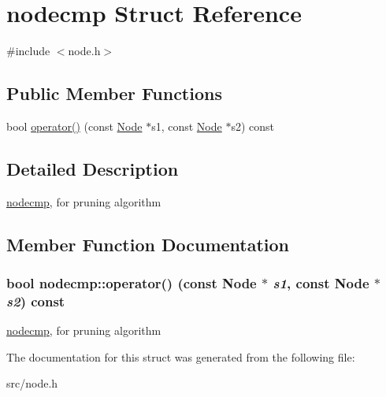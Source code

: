 \hypertarget{structnodecmp}{
\section{nodecmp Struct Reference}
\label{structnodecmp}
}


{\ttfamily \#include $<$node.h$>$}\subsection*{Public Member Functions}
\begin{DoxyCompactItemize}
\item 
bool \hyperlink{structnodecmp_a1125c1d530d06317a559aade3744bc78}{operator()} (const \hyperlink{classNode}{Node} $\ast$s1, const \hyperlink{classNode}{Node} $\ast$s2) const 
\end{DoxyCompactItemize}


\subsection{Detailed Description}
\hyperlink{structnodecmp}{nodecmp}, for pruning algorithm 

\subsection{Member Function Documentation}
\hypertarget{structnodecmp_a1125c1d530d06317a559aade3744bc78}{
\subsubsection[{operator()}]{\setlength{\rightskip}{0pt plus 5cm}bool nodecmp::operator() (const {\bf Node} $\ast$ {\em s1}, \/  const {\bf Node} $\ast$ {\em s2}) const}}
\label{structnodecmp_a1125c1d530d06317a559aade3744bc78}
\hyperlink{structnodecmp}{nodecmp}, for pruning algorithm 

The documentation for this struct was generated from the following file:\begin{DoxyCompactItemize}
\item 
src/node.h\end{DoxyCompactItemize}
